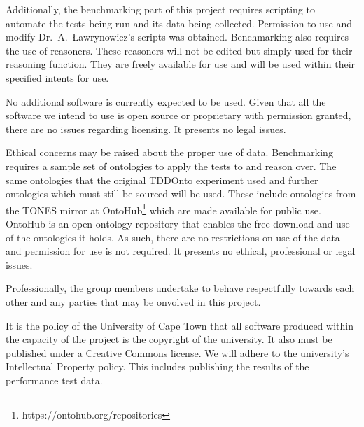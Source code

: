 \documentclass[draft]{sig-alternate}
\begin{document}
Additionally, the benchmarking part of this project requires scripting to automate the tests being run and its data being collected. Permission to use and modify Dr.\ A.\ {\L}awrynowicz's scripts was obtained. Benchmarking also requires the use of reasoners. These reasoners will not be edited but simply used for their reasoning function. They are freely available for use and will be used within their specified intents for use.

No additional software is currently expected to be used. Given that all the software we intend to use is open source or proprietary with permission granted, there are no issues regarding licensing. It presents no legal issues.

Ethical concerns may be raised about the proper use of data. Benchmarking requires a sample set of ontologies to apply the tests to and reason over. The same ontologies that the original TDDOnto experiment used \cite{DBLP:conf/dlog/LawrynowiczK16} and further ontologies which must still be sourced will be used. These include ontologies from the TONES mirror at OntoHub\footnote{https://ontohub.org/repositories} which are made available for public use. OntoHub is an open ontology repository that enables the free download and use of the ontologies it holds. As such, there are no restrictions on use of the data and permission for use is not required. It presents no ethical, professional or legal issues.

Professionally, the group members undertake to behave respectfully towards each other and any parties that may be onvolved in this project.

It is the policy of the University of Cape Town that all software produced within the capacity of the project is the copyright of the university. It also must be published under a Creative Commons license. We will adhere to the university's Intellectual Property policy. This includes publishing the results of the performance test data.



\end{document}
